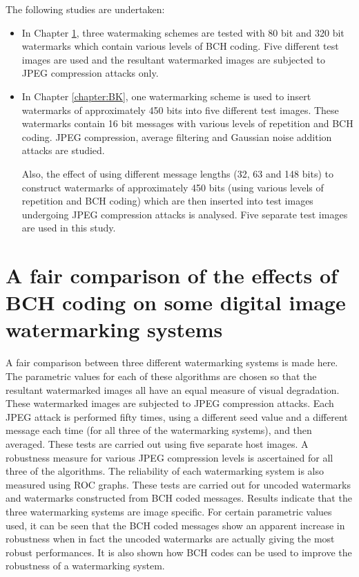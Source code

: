\documentclass[12pt]{report}
\begin{document}
The following studies are undertaken:
\begin{itemize}
	\item In Chapter \ref{chapter:80_320}, three watermaking schemes are
	tested with 80 bit and 320 bit watermarks which contain various levels of BCH
	coding. Five different test images are used and the resultant 
	watermarked images are subjected to JPEG compression 
	attacks only.

	\item In Chapter \ref{chapter:BK}, one watermarking scheme
	is used to insert watermarks of approximately 450 bits into five different test images.
	These watermarks contain 16 bit messages with various levels of repetition and BCH coding. 
	JPEG compression, average filtering and Gaussian noise addition attacks are studied.
	
	Also, the effect of using different message
	lengths (32, 63 and 148 bits) to construct 
	watermarks of approximately 450 bits (using various levels of repetition and BCH coding)
	which are then inserted into test images undergoing JPEG compression attacks is analysed.
	Five separate test images
	are used in this study.
\end{itemize}


\chapter{A fair comparison of the effects of BCH coding on some digital image watermarking systems}
\label{chapter:80_320}
A fair comparison between three different watermarking systems is made here. The parametric values 
for each of these algorithms are chosen so that the resultant watermarked images all have an equal 
measure of visual degradation. These watermarked images are subjected to JPEG compression attacks.
Each JPEG attack is performed fifty times, using a different seed value and a different message each time (for
all three of the watermarking systems), and then averaged. These tests are carried out using five separate host images.
A robustness measure for various JPEG compression levels is ascertained for all three of the algorithms. The
reliability of each watermarking system is also measured using 
ROC graphs. 
These tests are carried out for uncoded watermarks and watermarks constructed from BCH 
\cite{BKX:bchPlessBk} coded messages.
Results indicate that the three watermarking systems are image specific. 
For certain parametric values used, it can be seen that the BCH coded messages show 
an apparent increase in robustness when in fact the uncoded watermarks are actually giving the
most robust performances.
It is also shown how BCH codes can be used to improve the robustness of a watermarking system.
\end{document}
